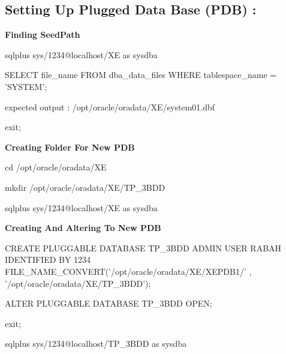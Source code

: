 \documentclass{article}
\begin{document}
\subsection{Setting Up Plugged Data Base (PDB) : }
\begin{tcolorbox}
\textbf{Finding SeedPath}

sqlplus sys/1234@localhost/XE as sysdba

SELECT file\_name FROM dba\_data\_files WHERE tablespace\_name = 'SYSTEM';

expected output : /opt/oracle/oradata/XE/system01.dbf

exit;

\textbf{Creating Folder For New PDB}

cd /opt/oracle/oradata/XE

mkdir /opt/oracle/oradata/XE/TP\_3BDD

sqlplus sys/1234@localhost/XE as sysdba

\textbf{Creating And Altering To New PDB}

CREATE PLUGGABLE DATABASE TP\_3BDD ADMIN USER RABAH IDENTIFIED BY 1234 FILE\_NAME\_CONVERT('/opt/oracle/oradata/XE/XEPDB1/' , '/opt/oracle/oradata/XE/TP\_3BDD');

ALTER PLUGGABLE DATABASE TP\_3BDD OPEN;

exit;

sqlplus sys/1234@localhost/TP\_3BDD as sysdba
\end{tcolorbox}
\end{document}
